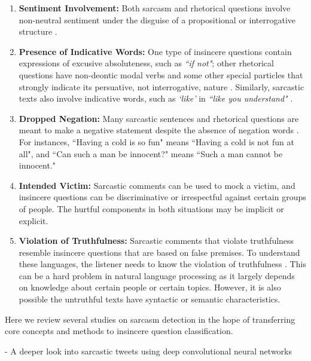\documentclass[12pt]{diazessay} %
\begin{document}
\begin{enumerate}
	\item \textbf{Sentiment Involvement:} Both sarcasm and rhetorical questions involve non-neutral sentiment under the disguise of a propositional or interrogative structure \citep{joshi2017, schmidt1977}. 
	\item \textbf{Presence of Indicative Words:} One type of insincere questions contain expressions of excusive absoluteness, such as \textit{``if not"}; other rhetorical questions have non-deontic modal verbs and some other special particles that strongly indicate its persuative, not interrogative, nature \citep{schmidt1977}. Similarly, sarcastic texts also involve indicative words, such as \textit{`like'} in \textit{``like you understand"} \citep{joshi2017}. 
	\item \textbf{Dropped Negation:} Many sarcastic sentences and rhetorical questions are meant to make a negative statement despite the absence of negation words  \citep{joshi2017, schmidt1977}. For instances, ``Having a cold is so fun" means ``Having a cold is not fun at all", and ``Can such a man be innocent?" means ``Such a man cannot be innocent."
	\item \textbf{Intended Victim:} Sarcastic comments can be used to mock a victim, and insincere questions can be discriminative or irrespectful against certain groups of people. The hurtful components in both situations may be implicit or explicit. 
	\item \textbf{Violation of Truthfulness:} Sarcastic comments that violate truthfulness resemble insincere questions that are based on false premises. To understand these languages, the listener needs to know the violation of truthfulness \citep{joshi2017}. This can be a hard problem in natural language processing as it largely depends on knowledge about certain people or certain topics. However, it is also possible the untruthful texts have syntactic or semantic characteristics.  
\end{enumerate}

Here we review several studies on sarcasm detection in the hope of transferring core concepts and methods to insincere question classification.

- A deeper look into sarcastic tweets using deep convolutional neural networks
\citep{poria2017}
\end{document}
